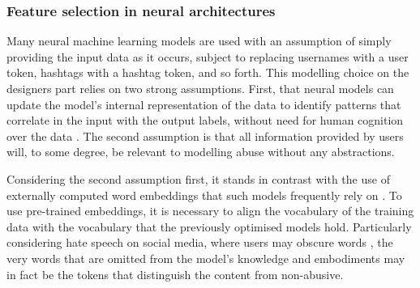 \subsubsection{Feature selection in neural architectures}
Many neural machine learning models are used with an assumption of simply providing the input data as it occurs, subject to replacing usernames with a user token, hashtags with a hashtag token, and so forth.
This modelling choice on the designers part relies on two strong assumptions. 
First, that neural models can  update the model's internal representation of the data  to identify patterns that correlate in the input  with the output labels, without  need for human cognition  over the data .
The second assumption is that all information provided by users will, to some degree, be relevant to modelling abuse without any abstractions.

Considering the second assumption first, it stands in contrast with the use of externally computed word embeddings that such models frequently rely on \citep{Kshirsagar:2018,Isaksen:2020}.
To use pre-trained embeddings, it is necessary to align the vocabulary of the training data with the vocabulary that the previously optimised models hold.
Particularly considering hate speech on social media, where users may  obscure words  \citep{Rottger:2021}, the very words that are omitted from the model's knowledge and embodiments may in fact be the tokens that distinguish the  content from non-abusive.

